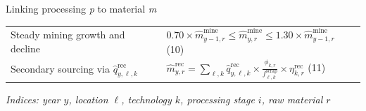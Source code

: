 \documentclass[10pt]{beamer}
\begin{document}
\begin{frame}{Linking processing \textit{p} to material \textit{m}}
\begin{table}[H]
{\begin{tabular}{>{\raggedright\arraybackslash}p{} | >{\raggedright\arraybackslash}p{}}
            \rowcolor{metublue!10}
            Steady mining growth and decline &
            $\displaystyle 0.70 \times \hat{m}^{\mathrm{mine}}_{y-1,r} \leq \hat{m}^{\mathrm{mine}}_{y,r} \leq 1.30 \times \hat{m}^{\mathrm{mine}}_{y-1,r}$ \hfill (10) \\
            
            Secondary sourcing via $\hat{q}^{\mathrm{rec}}_{y,\ell,k}$ &
            $\displaystyle \hat{m}^{\mathrm{rec}}_{y,r} = \sum_{\ell, k} \hat{q}^{\mathrm{rec}}_{y,\ell,k} \times \frac{\phi_{k,r}}{f^{\mathrm{scrap}}_{\ell,k}} \times \eta^{\mathrm{rec}}_{k,r}$ \hfill (11) \\
            \bottomrule
        \end{tabular}
        }
    \end{table}
    
    \vspace{-0.2cm}
    \begin{center}
        \scriptsize \textit{Indices: year $y$, location $\ell$, technology $k$, processing stage $i$, raw material $r$}
    \end{center}
\end{frame}
\end{document}
